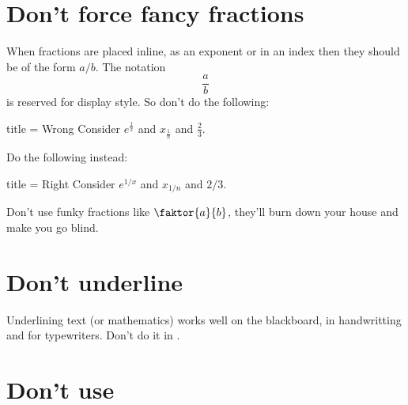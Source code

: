 \documentclass[a4paper, 10pt, headings=standardclasses, oneside, bibliography=totocnumbered]{scrbook}
\begin{document}
\section{Don’t force fancy fractions}

When fractions are placed inline, as an exponent or in an index then they should be of the form $a/b$.
The notation
\[
  \frac{a}{b}
\]
is reserved for display style.
So don’t do the following:
\begin{tcblisting}{title = {Wrong}}
Consider $e^{\frac{1}{x}}$ and $x_{\frac{1}{n}}$ and $\frac{2}{3}$.
\end{tcblisting}
Do the following instead:
\begin{tcblisting}{title = {Right}}
Consider $e^{1/x}$ and $x_{1/n}$ and $2/3$.
\end{tcblisting}

Don’t use funky fractions like $\faktor{a}{b}$, they’ll burn down your house and make you go blind.





\section{Don’t underline}
Underlining text (or mathematics) works well on the blackboard, in handwritting and for typewriters.
Don’t do it in .





\section{Don’t use }
\end{document}
